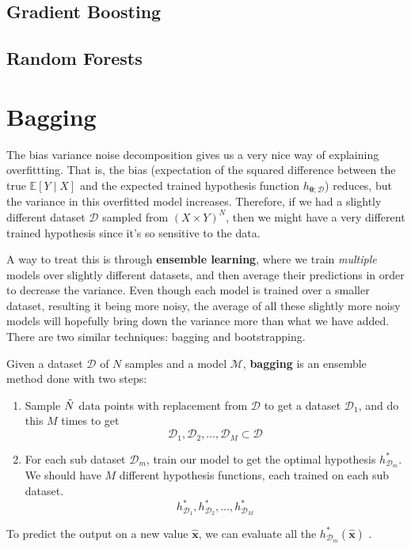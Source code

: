 \documentclass{article}
\begin{document}
  \subsection{Gradient Boosting}

  \subsection{Random Forests}

\section{Bagging}

  The bias variance noise decomposition gives us a very nice way of explaining overfittting. That is, the bias (expectation of the squared difference between the true $\mathbb{E}[Y \mid X]$ and the expected trained hypothesis function $h_{\boldsymbol{\theta}; \mathcal{D}}$) reduces, but the variance in this overfitted model increases. Therefore, if we had a slightly different dataset $\mathcal{D}$ sampled from $(X \times Y)^N$, then we might have a very different trained hypothesis since it's so sensitive to the data. 

  A way to treat this is through \textbf{ensemble learning}, where we train \textit{multiple} models over slightly different datasets, and then average their predictions in order to decrease the variance. Even though each model is trained over a smaller dataset, resulting it being more noisy, the average of all these slightly more noisy models will hopefully bring down the variance more than what we have added. There are two similar techniques: bagging and bootstrapping. 

  \begin{definition}
    Given a dataset $\mathcal{D}$ of $N$ samples and a model $\mathcal{M}$, \textbf{bagging} is an ensemble method done with two steps: 
    \begin{enumerate}
      \item Sample $\Tilde{N}$ data points with replacement from $\mathcal{D}$ to get a dataset $\mathcal{D}_1$, and do this $M$ times to get 
      \[\mathcal{D}_1, \mathcal{D}_2, \ldots, \mathcal{D}_M \subset \mathcal{D}\]
      \item For each sub dataset $\mathcal{D}_m$, train our model to get the optimal hypothesis $h_{\mathcal{D}_m}^\ast$. We should have $M$ different hypothesis functions, each trained on each sub dataset. 
      \[h_{\mathcal{D}_1}^\ast, h_{\mathcal{D}_2}^\ast, \ldots, h_{\mathcal{D}_M}^\ast\]
    \end{enumerate}
    To predict the output on a new value $\hat{\mathbf{x}}$, we can evaluate all the $h_{\mathcal{D}_m}^\ast (\hat{\mathbf{x}})$ .
  \end{definition}
\end{document}
